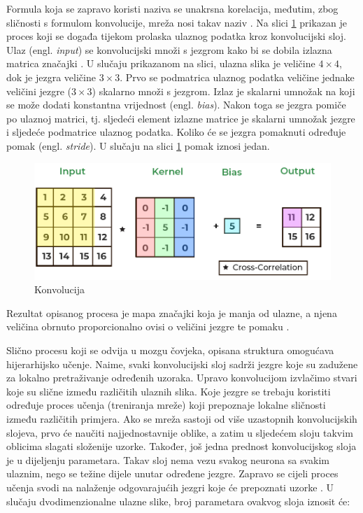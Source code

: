 Formula koja se zapravo koristi naziva se unakrsna korelacija, međutim, zbog sličnosti s 
formulom konvolucije, mreža nosi takav naziv \cite{gracan2020}. Na slici 
\ref{pic:convolution} prikazan je proces koji se događa tijekom prolaska 
ulaznog podatka kroz konvolucijski sloj. Ulaz (engl. \textit{input}) se konvolucijski množi
s jezgrom kako bi se dobila izlazna matrica značajki \cite{cnn_how}. U slučaju prikazanom na slici,
ulazna slika je veličine \(4 \times 4\), dok je jezgra veličine \(3 \times 3\). Prvo se podmatrica ulaznog
podatka veličine jednake veličini jezgre (\(3 \times 3\)) skalarno množi s jezgrom. Izlaz je 
skalarni umnožak na koji se može dodati konstantna vrijednost (engl. \textit{bias}). Nakon
toga se jezgra pomiče po ulaznoj matrici, tj. sljedeći element izlazne matrice je
skalarni umnožak jezgre i sljedeće podmatrice ulaznog podatka. Koliko će se jezgra
pomaknuti određuje pomak (engl. \textit{stride}). U slučaju na slici \ref{pic:convolution}
pomak iznosi jedan.

\begin{figure}[htb]
      \centering
      \includegraphics[width=0.5\linewidth]{Chapters/neuronska_mreza/CNN/convolution.png} 
      \caption{Konvolucija \cite{convolution}}
      \label{pic:convolution}
\end{figure}

Rezultat opisanog procesa je mapa značajki koja je manja od ulazne, a njena veličina
obrnuto proporcionalno ovisi o veličini jezgre te pomaku \cite{cnn_whatis}. 

Slično procesu koji se odvija u mozgu čovjeka, opisana struktura omogućava hijerarhijsko učenje.
Naime, svaki konvolucijski sloj sadrži jezgre koje su zadužene za lokalno pretraživanje
određenih uzoraka. Upravo konvolucijom izvlačimo stvari koje su slične između različitih
ulaznih slika. Koje jezgre se trebaju koristiti određuje proces učenja (treniranja
mreže) koji prepoznaje lokalne sličnosti između različitih primjera. Ako se mreža sastoji
od više uzastopnih konvolucijskih slojeva, prvo će naučiti najjednostavnije
oblike, a zatim u sljedećem sloju takvim oblicima slagati složenije uzorke. Također,
još jedna prednost konvolucijskog sloja je u dijeljenju parametara. Takav sloj nema vezu 
svakog neurona sa svakim ulaznim, nego se težine dijele unutar određene jezgre. Zapravo se
cijeli proces učenja svodi na nalaženje odgovarajućih jezgri koje će prepoznati uzorke \cite{pycodemates}.
U slučaju dvodimenzionalne ulazne slike, broj parametara ovakvog sloja iznosit će:

